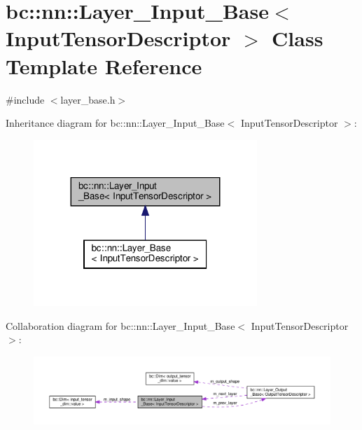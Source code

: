 \hypertarget{classbc_1_1nn_1_1Layer__Input__Base}{}\section{bc\+:\+:nn\+:\+:Layer\+\_\+\+Input\+\_\+\+Base$<$ Input\+Tensor\+Descriptor $>$ Class Template Reference}
\label{classbc_1_1nn_1_1Layer__Input__Base}


{\ttfamily \#include $<$layer\+\_\+base.\+h$>$}



Inheritance diagram for bc\+:\+:nn\+:\+:Layer\+\_\+\+Input\+\_\+\+Base$<$ Input\+Tensor\+Descriptor $>$\+:\nopagebreak
\begin{figure}[H]
\begin{center}
\leavevmode
\includegraphics[width=239pt]{classbc_1_1nn_1_1Layer__Input__Base__inherit__graph}
\end{center}
\end{figure}


Collaboration diagram for bc\+:\+:nn\+:\+:Layer\+\_\+\+Input\+\_\+\+Base$<$ Input\+Tensor\+Descriptor $>$\+:\nopagebreak
\begin{figure}[H]
\begin{center}
\leavevmode
\includegraphics[width=350pt]{classbc_1_1nn_1_1Layer__Input__Base__coll__graph}
\end{center}
\end{figure}

